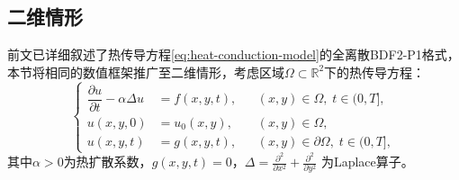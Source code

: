 \documentclass{GZUbachelorthesis}
\theoremstyle{chineseplain}
\begin{document}
%
\subsection{二维情形}
前文已详细叙述了热传导方程\eqref{eq:heat-conduction-model}的全离散BDF2-P1格式，本节将相同的数值框架推广至二维情形，考虑区域$\Omega \subset \mathbb{R}^2$下的热传导方程：
\begin{equation}
	\left\{
	\begin{aligned}
		\dfrac{\partial u}{\partial t} - \alpha \Delta u &= f(x,y,t), && (x,y) \in \Omega,\; t \in (0, T], \\
		u(x,y,0) &= u_0(x,y), && (x,y)\in \Omega, \\
		u(x,y,t) &= g(x,y,t), && (x,y) \in \partial\Omega,\; t \in (0, T],
	\end{aligned}
	\right.
	\label{eq:2d-heat-system}
\end{equation}
其中$\alpha>0$为热扩散系数，$ g(x,y,t)=0$，$\Delta=\frac{\partial^2}{\partial x^2} + \frac{\partial^2}{\partial y^2}$ 为Laplace算子。
\end{document}

